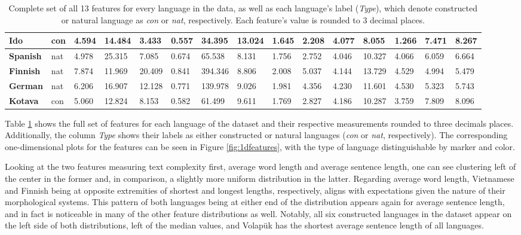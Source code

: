\documentclass[12pt,a4paper]{article}
\numberwithin{figure}{section}
\numberwithin{table}{section}
\numberwithin{definition}{section}
\begin{document}
\begin{table}[!h]
\begin{adjustbox}{width=\textwidth}
\begin{tabular}{|l|l|l|l|l|l|l|l|l|l|l|l|l|l|l|}
        \textbf{Ido} & con & 4.594 & 14.484 & 3.433 & 0.557 & 34.395 & 13.024 & 1.645 & 2.208 & 4.077 & 8.055 & 1.266 & 7.471 & 8.267 \\ \hline
        \textbf{Spanish} & nat & 4.978 & 25.315 & 7.085 & 0.674 & 65.538 & 8.131 & 1.756 & 2.752 & 4.046 & 10.327 & 4.066 & 6.059 & 6.664 \\ \hline
        \textbf{Finnish} & nat & 7.874 & 11.969 & 20.409 & 0.841 & 394.346 & 8.806 & 2.008 & 5.037 & 4.144 & 13.729 & 4.529 & 4.994 & 5.479 \\ \hline
        \textbf{German} & nat & 6.206 & 16.907 & 12.128 & 0.771 & 139.978 & 9.026 & 1.981 & 4.356 & 4.230 & 11.601 & 4.530 & 5.323 & 5.743 \\ \hline
        \textbf{Kotava} & con & 5.060 & 12.824 & 8.153 & 0.582 & 61.499 & 9.611 & 1.769 & 2.827 & 4.186 & 10.287 & 3.759 & 7.809 & 8.096 \\ \hline
    \end{tabular}
  \end{adjustbox}
  \caption{Complete set of all 13 features for every language in the data, as well as each language's label (\textit{Type}), which denote constructed or natural language as \textit{con} or \textit{nat}, respectively. Each feature's value is rounded to 3 decimal places.}
  \label{tbl:featurestable}
\end{table}

Table \ref{tbl:featurestable} shows the full set of features for each language of the dataset and their respective measurements rounded to three decimals places. Additionally, the column \textit{Type} shows their labels as either constructed or natural languages (\textit{con} or \textit{nat}, respectively). The corresponding one-dimensional plots for the features can be seen in Figure \ref{fig:1dfeatures}, with the type of language distinguishable by marker and color.

Looking at the two features measuring text complexity first, average word length and average sentence length, one can see clustering left of the center in the former and, in comparison, a slightly more uniform distribution in the latter. Regarding average word length, Vietnamese and Finnish being at opposite extremities of shortest and longest lengths, respectively, aligns with expectations given the nature of their morphological systems. This pattern of both languages being at either end of the distribution appears again for average sentence length, and in fact is noticeable in many of the other feature distributions as well. Notably, all six constructed languages in the dataset appear on the left side of both distributions, left of the median values, and Volapük has the shortest average sentence length of all languages.
\end{document}
